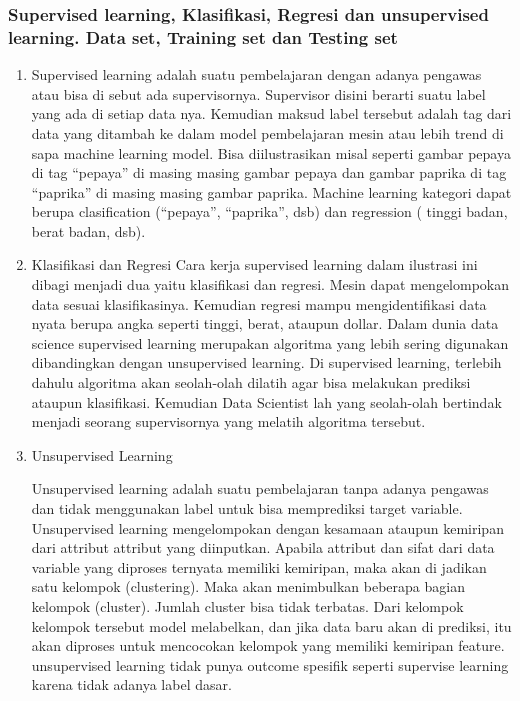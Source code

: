     

    \subsubsection{Supervised learning, Klasiﬁkasi, Regresi dan unsupervised learning. Data set, Training set dan Testing set}
    
    \begin{enumerate}
    
    \item Supervised learning adalah suatu pembelajaran dengan adanya pengawas atau bisa di sebut ada supervisornya. Supervisor disini berarti suatu label yang ada di setiap data nya. Kemudian maksud label tersebut adalah tag dari data yang ditambah ke dalam model pembelajaran mesin atau lebih trend di sapa machine learning model. Bisa diilustrasikan misal seperti gambar pepaya di tag “pepaya” di masing masing gambar pepaya dan gambar paprika di tag “paprika” di masing masing gambar paprika. Machine learning kategori dapat berupa clasification (“pepaya”, “paprika”, dsb) dan regression ( tinggi badan, berat badan, dsb). 

    \item Klasifikasi dan Regresi
Cara kerja supervised learning dalam ilustrasi ini dibagi menjadi dua yaitu klasifikasi dan regresi. Mesin dapat mengelompokan data sesuai klasifikasinya. Kemudian regresi mampu mengidentifikasi data nyata berupa angka seperti tinggi, berat, ataupun dollar. Dalam dunia data science supervised learning merupakan algoritma yang lebih sering digunakan dibandingkan dengan unsupervised learning. Di supervised learning, terlebih dahulu algoritma akan seolah-olah dilatih agar bisa melakukan prediksi ataupun klasifikasi. Kemudian Data Scientist lah yang seolah-olah bertindak menjadi seorang supervisornya yang melatih algoritma tersebut. 

\item Unsupervised Learning
\par
Unsupervised learning adalah suatu pembelajaran tanpa adanya pengawas dan tidak menggunakan label untuk bisa memprediksi target variable. Unsupervised learning mengelompokan dengan kesamaan ataupun kemiripan dari attribut attribut yang diinputkan. Apabila attribut dan sifat dari data variable yang diproses ternyata memiliki kemiripan, maka akan di jadikan satu kelompok (clustering). Maka akan menimbulkan beberapa bagian kelompok (cluster). Jumlah cluster bisa tidak terbatas. Dari kelompok kelompok tersebut model melabelkan, dan jika data baru akan di prediksi, itu akan diproses untuk mencocokan kelompok yang memiliki kemiripan feature. unsupervised learning tidak punya outcome spesifik seperti supervise learning karena tidak adanya label dasar.


\end{enumerate}
